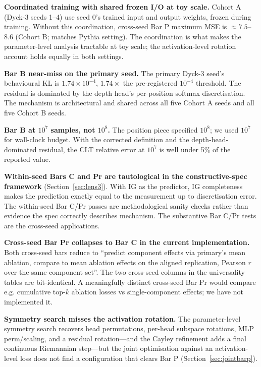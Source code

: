 \documentclass[11pt,letterpaper]{article}
\begin{document}
\textbf{Coordinated training with shared frozen I/O at toy scale.} Cohort A (Dyck-3 seeds 1--4) use seed 0's trained input and output weights, frozen during training. Without this coordination, cross-seed Bar P maximum MSE is $\approx 7.5$--$8.6$ (Cohort B; matches Pythia setting). The coordination is what makes the parameter-level analysis tractable at toy scale; the activation-level rotation account holds equally in both settings.

\textbf{Bar B near-miss on the primary seed.} The primary Dyck-3 seed's behavioural KL is $1.74 \times 10^{-4}$, $1.74\times$ the pre-registered $10^{-4}$ threshold. The residual is dominated by the depth head's per-position softmax discretisation. The mechanism is architectural and shared across all five Cohort A seeds and all five Cohort B seeds.

\textbf{Bar B at $10^7$ samples, not $10^8$.} The position piece specified $10^8$; we used $10^7$ for wall-clock budget. With the corrected definition and the depth-head-dominated residual, the CLT relative error at $10^7$ is well under 5\% of the reported value.

\textbf{Within-seed Bars C and Pr are tautological in the constructive-spec framework} (Section~\ref{sec:lens3}). With IG as the predictor, IG completeness makes the prediction exactly equal to the measurement up to discretisation error. The within-seed Bar C/Pr passes are methodological sanity checks rather than evidence the spec correctly describes mechanism. The substantive Bar C/Pr tests are the cross-seed applications.

\textbf{Cross-seed Bar Pr collapses to Bar C in the current implementation.} Both cross-seed bars reduce to ``predict component effects via primary's mean ablation, compare to mean ablation effects on the aligned replication, Pearson $r$ over the same component set''. The two cross-seed columns in the universality tables are bit-identical. A meaningfully distinct cross-seed Bar Pr would compare e.g. cumulative top-$k$ ablation losses vs single-component effects; we have not implemented it.

\textbf{Symmetry search misses the activation rotation.} The parameter-level symmetry search recovers head permutations, per-head subspace rotations, MLP perm/scaling, and a residual rotation---and the Cayley refinement adds a final continuous Riemannian step---but the joint optimisation against an activation-level loss does not find a configuration that clears Bar P (Section~\ref{sec:jointbarp}).
\end{document}
